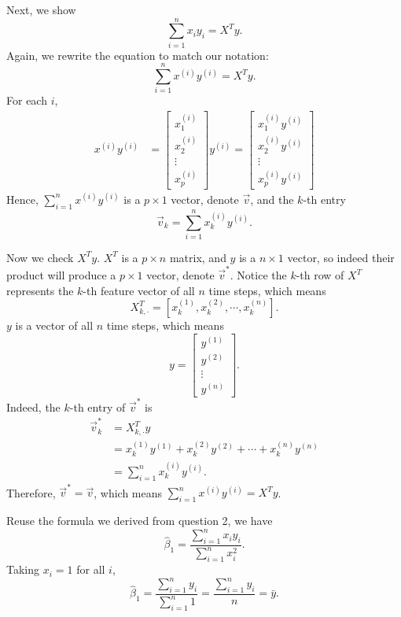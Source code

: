 \documentclass{article}
\begin{document}
Next, we show $$\sum_{i=1}^{n}x_iy_i = X^Ty.$$ Again, we rewrite the equation to match our notation:
$$\sum_{i=1}^{n}x^{(i)}y^{(i)} = X^Ty.$$
For each $i$,
\begin{align*}
    x^{(i)}y^{(i)} & = 
    \begin{bmatrix}
        x_1^{(i)} \\
        x_2^{(i)} \\
        \vdots \\
        x_p^{(i)}
      \end{bmatrix}y^{(i)} = 
    \begin{bmatrix}
        x_1^{(i)}y^{(i)} \\
        x_2^{(i)}y^{(i)} \\
        \vdots \\
        x_p^{(i)}y^{(i)}
      \end{bmatrix}
\end{align*}
Hence, $\sum_{i=1}^{n}x^{(i)}y^{(i)}$ is a $p\times 1$ vector, denote $\vec{v}$, and the $k$-th entry 
$$\vec{v}_k = \sum_{i=1}^{n}x_k^{(i)}y^{(i)}.$$

Now we check $X^Ty$. $X^T$ is a $p\times n$ matrix, and $y$ is a $n\times 1$ vector, so indeed their
product will produce a $p\times 1$ vector, denote $\vec{v}^*$. Notice the $k$-th row of $X^T$ represents the $k$-th 
feature vector of all $n$ time steps, which means 
$$X^T_{k,\cdot} = \left[x_k^{(1)}, x_k^{(2)}, \cdots, x_k^{(n)}\right].$$
$y$ is a vector of all $n$ time steps, which means
$$y = \begin{bmatrix}
    y^{(1)} \\
    y^{(2)} \\
    \vdots \\
    y^{(n)}
  \end{bmatrix}.$$
Indeed, the $k$-th entry of $\vec{v}^*$ is
\begin{align*}
    \vec{v}^*_k & = X^T_{k,\cdot}y \\
    & = x_k^{(1)}y^{(1)} + x_k^{(2)}y^{(2)} + \cdots + x_k^{(n)}y^{(n)} \\
    & = \sum_{i=1}^{n}x_k^{(i)}y^{(i)}.
\end{align*}
Therefore, $\vec{v}^* = \vec{v}$, which means $\sum_{i=1}^{n}x^{(i)}y^{(i)} = X^Ty$.

Reuse the formula we derived from question 2, we have 
$$\hat{\beta}_1 = \frac{\sum_{i=1}^{n}x_iy_i}{\sum_{i=1}^{n}x_i^2}.$$
Taking $x_i = 1$ for all $i$,
$$\hat{\beta}_1 = \frac{\sum_{i=1}^{n}y_i}{\sum_{i=1}^{n}1} = \frac{\sum_{i=1}^{n}y_i}{n} = \bar{y}.$$
\end{document}
